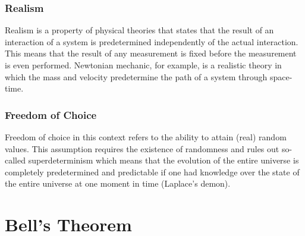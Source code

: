 \subsection{Realism}
\label{Basics:Realism}

Realism is a property of physical theories that states that the result of an interaction of a system is predetermined independently of the actual interaction. This means that the result of any measurement is fixed before the measurement is even performed.
Newtonian mechanic, for example, is a realistic theory in which the mass and velocity predetermine the path of a system through space-time.

\subsection{Freedom of Choice}
\label{Basics:FreedomofChoice}

Freedom of choice in this context refers to the ability to attain (real) random values.
This assumption requires the existence of randomness and rules out so-called superdeterminism which means that the evolution of the entire universe is completely predetermined and predictable if one had knowledge over the state of the entire universe at one moment in time (Laplace's demon).

\begin{comment}
\section{Photons and Filters}
\label{Basics:PhotonsandFilters}

Photons are discrete quanta of the electromagnetic field. For this work it's sufficient to regard photons as particles with a direction of propagation and a polarization in the perpendicular plane.
Polarization filters are devices that have a fixed direction of polarization. Photons that interact with the filter with absolutely the same polarization then the photon is ideally transmitted. A photon with perpendicular polarization will certainly be absorbed by the filter. For photons with an other polarization there's a certain chance of passing through. An ideal filter does not reflect any photons.
\end{comment}

\chapter{Bell's Theorem}
\label{BellsTheorem}

